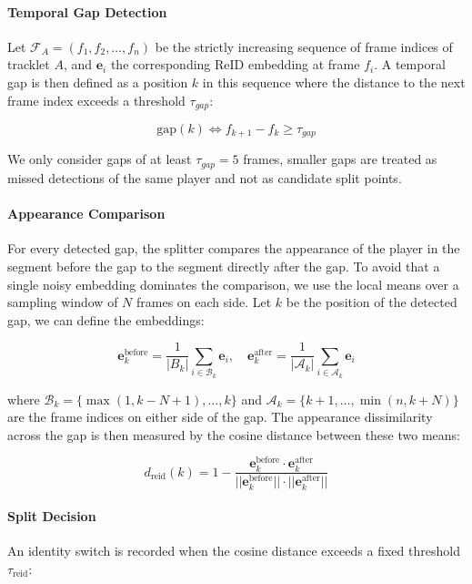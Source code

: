 \paragraph{Temporal Gap Detection}
Let $\mathcal{F}_A=(f_1,f_2,\dots,f_n)$  be the strictly increasing sequence of frame indices of tracklet $A$, and $\textbf{e}_i$ the corresponding ReID embedding at frame $f_i$. A temporal gap is then defined as a position $k$ in this sequence where the distance to the next frame index exceeds a threshold $\tau_{gap}$:

\begin{equation}
    \text{gap}(k) \iff f_{k+1} - f_k \geq \tau_{gap}
\end{equation}

We only consider gaps of at least $\tau_{gap}=5$ frames, smaller gaps are treated as missed detections of the same player and not as candidate split points.

\paragraph{Appearance Comparison}
For every detected gap,  the splitter compares the appearance of the player in the segment before the gap to the segment directly after the gap. To avoid that a single noisy embedding dominates the comparison, we use the local means over a sampling window of $N$ frames on each side. Let $k$ be the position of the detected gap, we can define the embeddings:

\begin{equation}
    \textbf{e}_k^\text{before} = \frac{1}{|B_k|}\sum_{i \in \mathcal{B}_k}\textbf{e}_i,
    \quad 
    \textbf{e}_k^\text{after} = \frac{1}{|\mathcal{A}_k|}\sum_{i\in \mathcal{A}_k}\textbf{e}_i
\end{equation}

where $\mathcal{B}_k=\{\max(1, k-N+1),\dots, k\}$ and $\mathcal{A}_k=\{k+1,\dots,\min(n,k+N)\}$ are the frame indices on either side of the gap. The appearance dissimilarity across the gap is then measured by the cosine distance between these two means:

\begin{equation}
    d_\text{reid} (k)=1-\frac{\textbf{e}_k^\text{before} \cdot \textbf{e}_k^\text{after}}{||\textbf{e}_k^\text{before}|| \cdot ||\textbf{e}_k^\text{after}||}
\end{equation}

\paragraph{Split Decision}
An identity switch is recorded when the cosine distance exceeds a fixed threshold $\tau_\text{reid}$:

